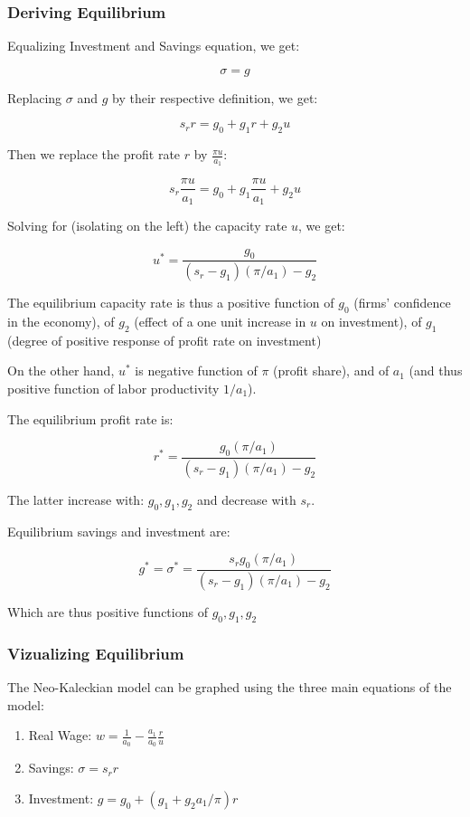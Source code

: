 \documentclass[
  letterpaper,
  DIV=11,
  numbers=noendperiod]{scrreprt}
\begin{document}
\hypertarget{deriving-equilibrium}{%
\subsubsection{Deriving Equilibrium}\label{deriving-equilibrium}}

Equalizing Investment and Savings equation, we get:

\[
\sigma = g
\]

Replacing \(\sigma\) and \(g\) by their respective definition, we get:

\[s_rr= g_0+g_1r+g_2u\]

Then we replace the profit rate \(r\) by \(\frac{\pi u}{a_1}\):

\[s_r\frac{\pi u}{a_1}= g_0+g_1\frac{\pi u}{a_1}+g_2u\]

Solving for (isolating on the left) the capacity rate \(u\), we get:

\[
u^* = \frac{g_0}{(s_r-g_1)(\pi/a_1)-g_2}
\]

The equilibrium capacity rate is thus a positive function of \(g_0\)
(firms' confidence in the economy), of \(g_2\) (effect of a one unit
increase in \(u\) on investment), of \(g_1\) (degree of positive
response of profit rate on investment)

On the other hand, \(u^*\) is negative function of \(\pi\) (profit
share), and of \(a_1\) (and thus positive function of labor productivity
\(1/a_1\)).

The equilibrium profit rate is:

\[
r^* = \frac{g_0 (\pi / a_1)}{(s_r-g_1)(\pi / a_1)-g_2}
\]

The latter increase with: \(g_0, g_1, g_2\) and decrease with \(s_r\).

Equilibrium savings and investment are:

\[
g^*=\sigma^*=\frac{s_r g_0(\pi/a_1)}{(s_r-g_1)(\pi /a_1)-g_2}
\]

Which are thus positive functions of \(g_0, g_1, g_2\)

\hypertarget{vizualizing-equilibrium}{%
\subsubsection{Vizualizing Equilibrium}\label{vizualizing-equilibrium}}

The Neo-Kaleckian model can be graphed using the three main equations of
the model:

\begin{enumerate}
\def\labelenumi{\arabic{enumi}.}
\item
  Real Wage: \(w = \frac{1}{a_0} - \frac{a_1}{a_0} \frac{r}{u}\)
\item
  Savings: \(\sigma = s_rr\)
\item
  Investment: \(g = g_0+(g_1+g_2a_1/\pi)r\)
\end{enumerate}
\end{document}
